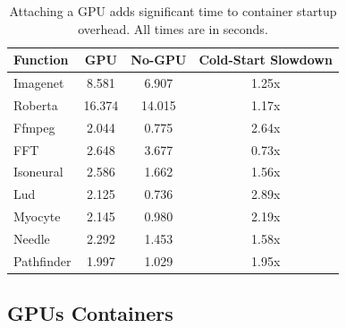\begin{table}
  \centering
  \caption{Attaching a GPU adds significant time to container startup overhead. All times are in seconds.}
  \label{tab:gpu-attatch}
  \begin{tabular}{lccc}
    \hline
    Function & GPU & No-GPU & Cold-Start Slowdown \\
    \hline
  Imagenet & 8.581 & 6.907 & 1.25x \\
  Roberta & 16.374 & 14.015 & 1.17x \\
  Ffmpeg & 2.044 & 0.775 & 2.64x \\
  FFT & 2.648 & 3.677 & 0.73x \\
  Isoneural & 2.586 & 1.662 & 1.56x \\
  Lud & 2.125 & 0.736 & 2.89x \\
  Myocyte & 2.145 & 0.980 & 2.19x \\
  Needle & 2.292 & 1.453 & 1.58x \\
  Pathfinder & 1.997 & 1.029 & 1.95x \\
  \end{tabular}
\end{table}

\subsection{GPUs Containers}

